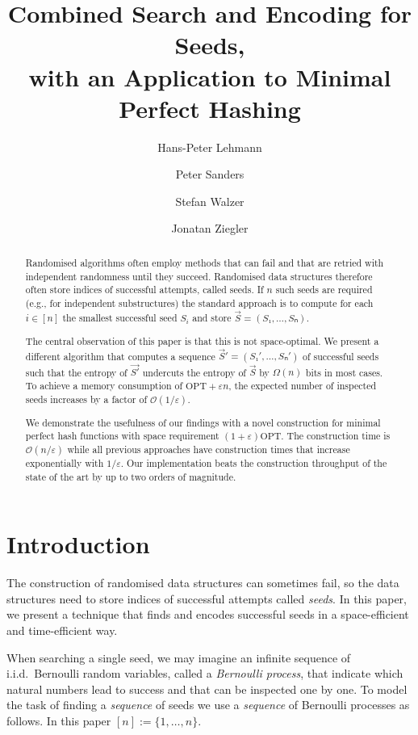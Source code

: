 \documentclass[cleveref,thm-restate]{lipics-v2021}
\title{Combined Search and Encoding for Seeds,\texorpdfstring{\\ }{ }with an Application to Minimal Perfect Hashing}
\author{Hans-Peter Lehmann}{Karlsruhe Institute of Technology, Germany}{hans-peter.lehmann@kit.edu}{https://orcid.org/0000-0002-0474-1805}{}
\author{Peter Sanders}{Karlsruhe Institute of Technology, Germany}{sanders@kit.edu}{https://orcid.org/0000-0003-3330-9349}{}
\author{Stefan Walzer}{Karlsruhe Institute of Technology, Germany}{stefan.walzer@kit.edu}{https://orcid.org/0000-0002-6477-0106}{}
\author{Jonatan Ziegler}{Karlsruhe Institute of Technology, Germany}{jonatan.ziegler@student.kit.edu}{}{}
\def\OPT{\mathrm{OPT}}
\begin{document}
\maketitle
\begin{abstract}
    Randomised algorithms often employ methods that can fail and that are retried with independent randomness until they succeed. Randomised data structures therefore often store indices of successful attempts, called seeds.
    If $n$ such seeds are required (e.g., for independent substructures) the standard approach is to compute for each $i ∈ [n]$ the smallest successful seed $S_i$ and store $\vec{S} = (S₁,…,Sₙ)$.

    The central observation of this paper is that this is not space-optimal. We present a different algorithm that computes a sequence $\vec{S}' = (S₁',…,Sₙ')$ of successful seeds such that the entropy of $\vec{S'}$ undercuts the entropy of $\vec{S}$ by $Ω(n)$ bits in most cases. To achieve a memory consumption of $\OPT+εn$, the expected number of inspected seeds increases by a factor of $𝒪(1/ε)$.

    We demonstrate the usefulness of our findings with a novel construction for minimal perfect hash functions with space requirement $(1+ε)\OPT$.
    The construction time is $𝒪(n/ε)$ while all previous approaches have construction times that increase exponentially with $1/ε$.
    Our implementation beats the construction throughput of the state of the art by up to two orders of magnitude.
\end{abstract}

\section{Introduction}
The construction of randomised data structures can sometimes fail, so the data structures need to store indices of successful attempts called \emph{seeds}.
In this paper, we present a technique that finds and encodes successful seeds in a space-efficient and time-efficient way.

When searching a single seed, we may imagine an infinite sequence of i.i.d.\ Bernoulli random variables, called a \emph{Bernoulli process}, that indicate which natural numbers lead to success and that can be inspected one by one.
To model the task of finding a \emph{sequence} of seeds we use a \emph{sequence} of Bernoulli processes as follows. In this paper $[n] := \{1,…,n\}$.
\end{document}

